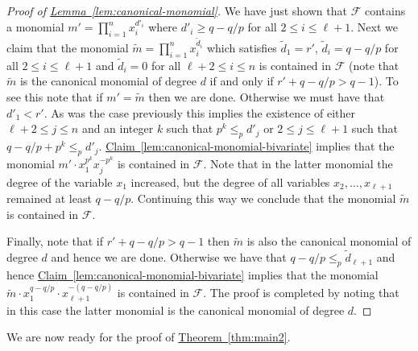 \documentclass[10pt]{article}
\theoremstyle{definition}
\numberwithin{equation}{section}
\newcommand{\expref}[2]{\texorpdfstring{\hyperref[#2]{#1~\ref{#2}}}{#1~\ref{#2}}}
\newcommand{\cF}{{\mathcal{F}}}
\begin{document}
\begin{proof}[Proof of \expref{Lemma}{lem:canonical-monomial}]
We have just shown that $\cF$ contains a monomial $m' = \prod_{i=1}^n x_i^{d'_i}$ where $d'_i \geq q-q/p$ for all $2 \leq i \leq \ell+1$.
Next we claim that the monomial ${\widetilde m} = \prod_{i=1}^n x_i^{{\widetilde d}_i}$ which satisfies
${\widetilde d}_1 = r'$, ${\widetilde d}_i=q-q/p$ for all $2 \leq i \leq \ell+1$ and ${\widetilde d}_i =0$ for all $\ell+2 \leq i \leq n$ is contained in $\cF$ (note that $\widetilde m$ is the canonical monomial of degree $d$ if and only if $r' + q-q/p > q-1$). To see this note that if $m' = \widetilde m$ then we are done.
Otherwise we must have that $d'_1 < r'$. As was the case previously this implies the existence of either $\ell+2 \leq j \leq n$ and an integer $k$ such that $p^k \leq_p d'_j$
or $2 \leq j \leq \ell+1$ such that $q-q/p + p^k \leq_p d'_j$. \expref{Claim}{lem:canonical-monomial-bivariate} implies that the monomial $m' \cdot x_1^{p^k} x_j^{-p^k}$ is contained
in $\cF$. Note that in  the latter monomial the degree of the variable $x_1$ increased, but the degree of all variables $x_2,\ldots,x_{\ell+1}$ remained at least $q-q/p$. Continuing this way we conclude that
the monomial $\widetilde m $ is contained in $\cF$.

Finally, note that if $r' +q-q/p >q-1$ then $\widetilde m $ is also the canonical monomial
of degree $d$ and hence we are done. Otherwise we have that $q-q/p \leq_p {\widetilde d}_{\ell+1}$ and hence \expref{Claim}{lem:canonical-monomial-bivariate} implies that the monomial
$ {\widetilde m} \cdot x_1^{q-q/p} \cdot x_{\ell+1}^{-(q-q/p)}$ is contained in $\cF$. The proof is completed by noting that in this case the latter monomial is the canonical monomial of degree
$d$.
\end{proof}

We are now ready for the proof of \expref{Theorem}{thm:main2}.
\end{document}
